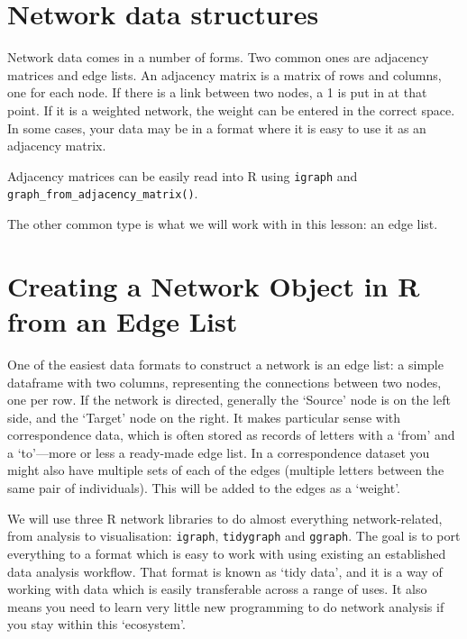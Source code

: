 \documentclass[
]{book}
\begin{document}
\hypertarget{network-data-structures}{%
\section{Network data structures}\label{network-data-structures}}

Network data comes in a number of forms. Two common ones are adjacency matrices and edge lists. An adjacency matrix is a matrix of rows and columns, one for each node. If there is a link between two nodes, a 1 is put in at that point. If it is a weighted network, the weight can be entered in the correct space. In some cases, your data may be in a format where it is easy to use it as an adjacency matrix.

Adjacency matrices can be easily read into R using \texttt{igraph} and \texttt{graph\_from\_adjacency\_matrix()}.

The other common type is what we will work with in this lesson: an edge list.

\hypertarget{creating-a-network-object-in-r-from-an-edge-list}{%
\section{Creating a Network Object in R from an Edge List}\label{creating-a-network-object-in-r-from-an-edge-list}}

One of the easiest data formats to construct a network is an edge list: a simple dataframe with two columns, representing the connections between two nodes, one per row. If the network is directed, generally the `Source' node is on the left side, and the `Target' node on the right. It makes particular sense with correspondence data, which is often stored as records of letters with a `from' and a `to'---more or less a ready-made edge list. In a correspondence dataset you might also have multiple sets of each of the edges (multiple letters between the same pair of individuals). This will be added to the edges as a `weight'.

We will use three R network libraries to do almost everything network-related, from analysis to visualisation: \texttt{igraph}, \texttt{tidygraph} and \texttt{ggraph}. The goal is to port everything to a format which is easy to work with using existing an established data analysis workflow. That format is known as `tidy data', and it is a way of working with data which is easily transferable across a range of uses. It also means you need to learn very little new programming to do network analysis if you stay within this `ecosystem'.
\end{document}
